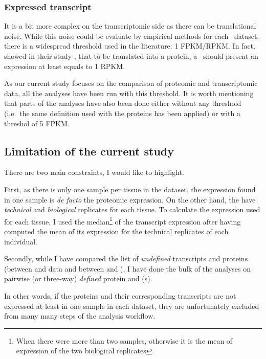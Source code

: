 \subsubsection{Expressed transcript}
It is a bit more complex on the transcriptomic side as there can be
translational noise. While this noise could be evaluate by empirical methods for
each \Rnaseq\ dataset, there is a widespread threshold used in the literature:
1 \gls{FPKM}/\gls{RPKM}. In fact,~\cite{Hebenstreit:2011} showed in
their study , that to be translated into a protein, a \mRNA\ should
present an expression at least equals to 1 \gls{RPKM}.

As our current study focuses on the comparison of proteomic and transcriptomic
data, all the analyses have been run with this threshold. It is worth mentioning
that parts of the analyses have also been done either without
any threshold (i.e.\ the same definition used with the proteins has been applied)
or with a threshol of 5 \gls{FPKM}.

\subsection{Limitation of the current study}

There are two main constraints, I would like to highlight.

First, as there is only one sample per tissue in the 
dataset, the expression found in one sample is \textit{de facto} the proteomic
expression. On the other hand, the  have \emph{technical}
and \emph{biological} replicates for each tissue. To calculate the expression
used for each tissue, I used the median\footnote{When there were more than
two samples, otherwise it is the mean of expression of the two biological
replicates} of the transcript expression after having computed the mean of its
expression for the technical replicates of each individual.


Secondly, while I have compared the list of \emph{undefined} transcripts and
proteins (between  and  data and
between  and ), I have done the bulk of the
analyses on pairwise (or three-way) \emph{defined} protein and \mRNA(s).

In other words, if the proteins and their corresponding transcripts are not
expressed at least in one sample in each dataset, they are unfortunately excluded
from many many steps of the analysis workflow.

